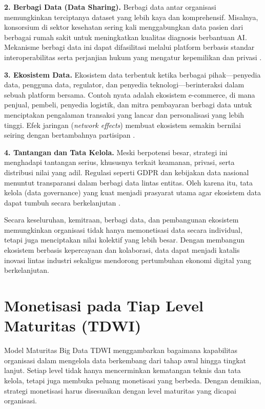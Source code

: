 \textbf{2. Berbagi Data (Data Sharing).}  
Berbagi data antar organisasi memungkinkan terciptanya dataset yang lebih kaya dan komprehensif. Misalnya, konsorsium di sektor kesehatan sering kali menggabungkan data pasien dari berbagai rumah sakit untuk meningkatkan kualitas diagnosis berbantuan AI. Mekanisme berbagi data ini dapat difasilitasi melalui platform berbasis standar interoperabilitas serta perjanjian hukum yang mengatur kepemilikan dan privasi \cite{ristevski2018}. 

\textbf{3. Ekosistem Data.}  
Ekosistem data terbentuk ketika berbagai pihak—penyedia data, pengguna data, regulator, dan penyedia teknologi—berinteraksi dalam sebuah platform bersama. Contoh nyata adalah ekosistem e-commerce, di mana penjual, pembeli, penyedia logistik, dan mitra pembayaran berbagi data untuk menciptakan pengalaman transaksi yang lancar dan personalisasi yang lebih tinggi. Efek jaringan (\textit{network effects}) membuat ekosistem semakin bernilai seiring dengan bertambahnya partisipan \cite{eisenmann2011platform}.  

\textbf{4. Tantangan dan Tata Kelola.}  
Meski berpotensi besar, strategi ini menghadapi tantangan serius, khususnya terkait keamanan, privasi, serta distribusi nilai yang adil. Regulasi seperti GDPR dan kebijakan data nasional menuntut transparansi dalam berbagi data lintas entitas. Oleh karena itu, tata kelola (data governance) yang kuat menjadi prasyarat utama agar ekosistem data dapat tumbuh secara berkelanjutan \cite{sadiq2017}. 

Secara keseluruhan, kemitraan, berbagi data, dan pembangunan ekosistem memungkinkan organisasi tidak hanya memonetisasi data secara individual, tetapi juga menciptakan nilai kolektif yang lebih besar. Dengan membangun ekosistem berbasis kepercayaan dan kolaborasi, data dapat menjadi katalis inovasi lintas industri sekaligus mendorong pertumbuhan ekonomi digital yang berkelanjutan.

\section{Monetisasi pada Tiap Level Maturitas (TDWI)}

Model Maturitas Big Data TDWI menggambarkan bagaimana kapabilitas organisasi dalam mengelola data berkembang dari tahap awal hingga tingkat lanjut. Setiap level tidak hanya mencerminkan kematangan teknis dan tata kelola, tetapi juga membuka peluang monetisasi yang berbeda. Dengan demikian, strategi monetisasi harus disesuaikan dengan level maturitas yang dicapai organisasi.

